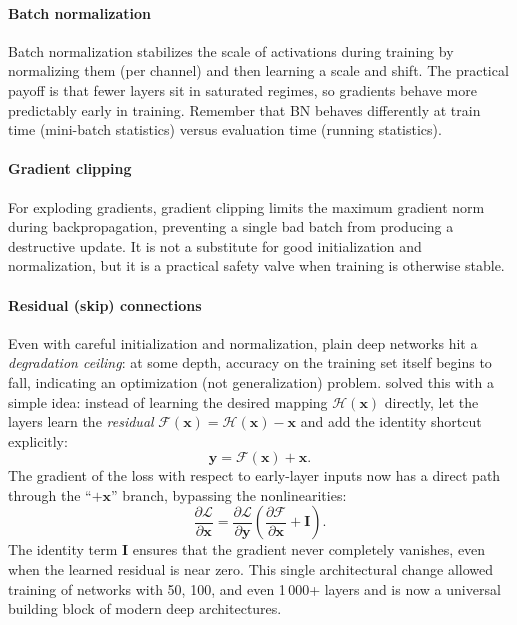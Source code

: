 \paragraph{Batch normalization}

Batch normalization stabilizes the scale of activations during training by normalizing them (per channel) and then learning a scale and shift. The practical payoff is that fewer layers sit in saturated regimes, so gradients behave more predictably early in training. Remember that BN behaves differently at train time (mini-batch statistics) versus evaluation time (running statistics).

\paragraph{Gradient clipping}

For exploding gradients, gradient clipping limits the maximum gradient norm during backpropagation, preventing a single bad batch from producing a destructive update. It is not a substitute for good initialization and normalization, but it is a practical safety valve when training is otherwise stable.

\paragraph{Residual (skip) connections}

Even with careful initialization and normalization, plain deep networks hit a \emph{degradation ceiling}: at some depth, accuracy on the training set itself begins to fall, indicating an optimization (not generalization) problem. \citet{He2016} solved this with a simple idea: instead of learning the desired mapping \(\mathcal{H}(\mathbf{x})\) directly, let the layers learn the \emph{residual} \(\mathcal{F}(\mathbf{x}) = \mathcal{H}(\mathbf{x}) - \mathbf{x}\) and add the identity shortcut explicitly:
\[
  \mathbf{y} = \mathcal{F}(\mathbf{x}) + \mathbf{x}.
\]
The gradient of the loss with respect to early-layer inputs now has a direct path through the ``\(+\mathbf{x}\)'' branch, bypassing the nonlinearities:
\[
  \frac{\partial \mathcal{L}}{\partial \mathbf{x}} = \frac{\partial \mathcal{L}}{\partial \mathbf{y}}\left(\frac{\partial \mathcal{F}}{\partial \mathbf{x}} + \mathbf{I}\right).
\]
The identity term \(\mathbf{I}\) ensures that the gradient never completely vanishes, even when the learned residual is near zero. This single architectural change allowed training of networks with 50, 100, and even 1\,000+ layers and is now a universal building block of modern deep architectures.

